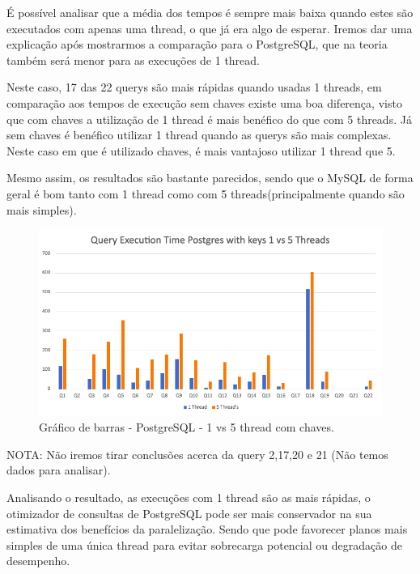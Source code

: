 \documentclass{article}
\begin{document}
  \texttt{}\par É possível analisar que a média dos tempos é sempre mais baixa quando estes são executados com apenas uma thread, o que já era algo de esperar. Iremos dar uma explicação após mostrarmos a comparação para o PostgreSQL, que na teoria também será menor para as execuções de 1 thread.
    
  Neste caso, 17 das 22 querys são mais rápidas quando usadas 1 threads, em comparação aos tempos de execução sem chaves existe uma boa diferença, visto que com chaves a utilização de 1 thread é mais benéfico do que com 5 threads. Já sem chaves é benéfico utilizar 1 thread quando as querys são mais complexas. Neste caso em que é utilizado chaves, é mais vantajoso utilizar 1 thread que 5.

  Mesmo assim, os resultados são bastante parecidos, sendo que o MySQL de forma geral é bom tanto com 1 thread como com 5 threads(principalmente quando são mais simples).

  \begin{figure}[H]
    \centering
    \includegraphics[width=\textwidth]{Graphs/postgres_withkeys_1vs5.png}
    \caption{Gráfico de barras - PostgreSQL - 1 vs 5 thread com chaves.} 
    \label{fig:PKCreation2}
  \end{figure}

  NOTA: Não iremos tirar conclusões acerca da query 2,17,20 e 21 (Não temos dados para analisar).

Analisando o resultado, as execuções com 1 thread são as mais rápidas, o otimizador de consultas de PostgreSQL pode ser mais conservador na sua estimativa dos benefícios da paralelização. Sendo que pode favorecer planos mais simples de uma única thread para evitar sobrecarga potencial ou degradação de desempenho.
  
  
  
\end{document}
